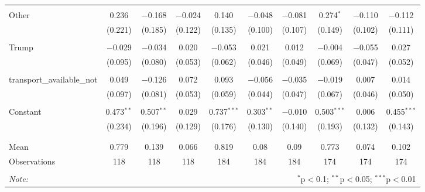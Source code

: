 \begin{tabular}{@{\extracolsep{5pt}}lccccccccc}
  & & & & & & & & & \\ 
 Other & 0.236 & $-$0.168 & $-$0.024 & 0.140 & $-$0.048 & $-$0.081 & 0.274$^{*}$ & $-$0.110 & $-$0.112 \\ 
  & (0.221) & (0.185) & (0.122) & (0.135) & (0.100) & (0.107) & (0.149) & (0.102) & (0.111) \\ 
  & & & & & & & & & \\ 
 Trump & $-$0.029 & $-$0.034 & 0.020 & $-$0.053 & 0.021 & 0.012 & $-$0.004 & $-$0.055 & 0.027 \\ 
  & (0.095) & (0.080) & (0.053) & (0.062) & (0.046) & (0.049) & (0.069) & (0.047) & (0.052) \\ 
  & & & & & & & & & \\ 
 transport\_available\_not & 0.049 & $-$0.126 & 0.072 & 0.093 & $-$0.056 & $-$0.035 & $-$0.019 & 0.007 & 0.014 \\ 
  & (0.097) & (0.081) & (0.053) & (0.059) & (0.044) & (0.047) & (0.067) & (0.046) & (0.050) \\ 
  & & & & & & & & & \\ 
 Constant & 0.473$^{**}$ & 0.507$^{**}$ & 0.029 & 0.737$^{***}$ & 0.303$^{**}$ & $-$0.010 & 0.503$^{***}$ & 0.006 & 0.455$^{***}$ \\ 
  & (0.234) & (0.196) & (0.129) & (0.176) & (0.130) & (0.140) & (0.193) & (0.132) & (0.143) \\ 
  & & & & & & & & & \\ 
\hline \\[-1.8ex] 
Mean & 0.779 & 0.139 & 0.066 & 0.819 & 0.08 & 0.09 & 0.773 & 0.074 & 0.102 \\ 
Observations & 118 & 118 & 118 & 184 & 184 & 184 & 174 & 174 & 174 \\ 
\hline 
\hline \\[-1.8ex] 
\textit{Note:}  & \multicolumn{9}{r}{$^{*}$p$<$0.1; $^{**}$p$<$0.05; $^{***}$p$<$0.01} \\ 
\end{tabular} 
